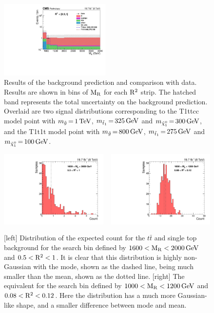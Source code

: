 \begin{figure}[htpb]
\includegraphics[width=0.49\textwidth]{figures/razor_results/bg_prediction_plot_R2bin4}
\caption{Results of the background prediction and comparison with data. Results are shown in bins of
$\mathrm{M_R}$ for each $\mathrm{R^2}$ strip. 
The hatched band represents the total uncertainty on the background prediction. 
Overlaid are two signal distributions corresponding to the T1ttcc model point with
$m_{\tilde{g}} \,{=}\, 1\,\text{Te\hspace{-.08em}V}$, $m_{\tilde{t}_1} \,{=}\, 325\,\text{Ge\hspace{-.08em}V}$ and $m_{\tilde{\chi}_1^0} \,{=}\,
300\,\text{Ge\hspace{-.08em}V}$, and the T1t1t model point with $m_{\tilde{g}} \,{=}\, 800\,\text{Ge\hspace{-.08em}V}$, $m_{\tilde{t}_1}
\,{=}\, 275\,\text{Ge\hspace{-.08em}V}$ and $m_{\tilde{\chi}_1^0} \,{=}\, 100\,\text{Ge\hspace{-.08em}V}$. 
\label{fig:results_prediction}}
\end{figure}



\begin{figure}[htpb]
  \centering
  \includegraphics[width=0.48\textwidth]{figures/razor_results/mean_mode_b_S_TTJ_019}
  ~
  \includegraphics[width=0.48\textwidth]{figures/razor_results/mean_mode_b_S_TTJ_005}
  \caption{[left] Distribution of the expected count for the $t\bar{t}$ and single top background
for the search bin defined by $1600 < \mathrm{M_R} < 2000\,\text{Ge\hspace{-.08em}V}$ and $0.5 < \mathrm{R^2} < 1$. It is clear that this
distribution is highly non-Gaussian with the mode, shown as the dashed line, being much smaller than
the mean, shown as the dotted line. [right] The equivalent for the search bin defined by $1000 < \mathrm{M_R}
< 1200\,\text{Ge\hspace{-.08em}V}$ and $0.08 < \mathrm{R^2} < 0.12$. Here the distribution has a much more Gaussian-like shape,
and a smaller difference between mode and mean.
  \label{fig:boost_results_mean_mode}}
\end{figure}



